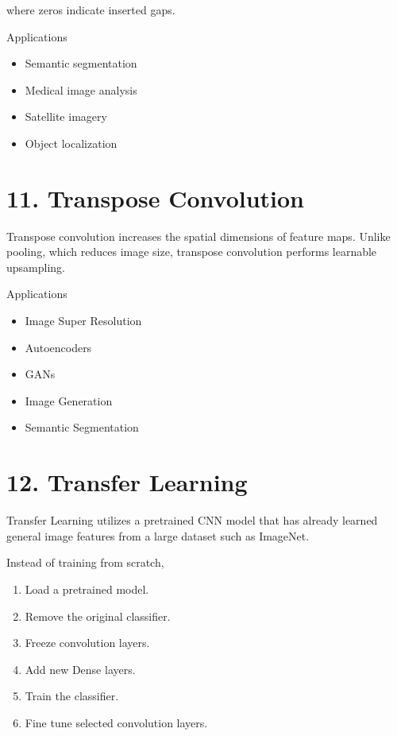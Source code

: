 \documentclass[11pt]{article}
\begin{document}
where zeros indicate inserted gaps.

Applications

\begin{itemize}
\item Semantic segmentation
\item Medical image analysis
\item Satellite imagery
\item Object localization
\end{itemize}


\section*{11. Transpose Convolution}

Transpose convolution increases the spatial dimensions of feature maps.
Unlike pooling, which reduces image size, transpose convolution performs
learnable upsampling.

Applications

\begin{itemize}
\item Image Super Resolution
\item Autoencoders
\item GANs
\item Image Generation
\item Semantic Segmentation
\end{itemize}


\section*{12. Transfer Learning}

Transfer Learning utilizes a pretrained CNN model that has already learned
general image features from a large dataset such as ImageNet.

Instead of training from scratch,

\begin{enumerate}
\item Load a pretrained model.
\item Remove the original classifier.
\item Freeze convolution layers.
\item Add new Dense layers.
\item Train the classifier.
\item Fine tune selected convolution layers.
\end{enumerate}
\end{document}
